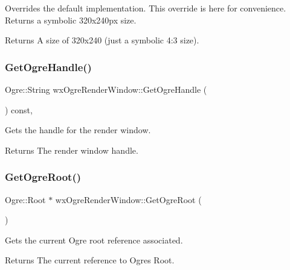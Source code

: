 Overrides the default implementation. This override is here for convenience. Returns a symbolic 320x240px size. \begin{DoxyReturn}{Returns}
A size of 320x240 (just a symbolic 4\+:3 size). 
\end{DoxyReturn}
\mbox{\label{classwx_ogre_render_window_ab855c41487a9b8154be824ff91260f90}} 
\subsubsection{\texorpdfstring{Get\+Ogre\+Handle()}{GetOgreHandle()}}
{\footnotesize\ttfamily Ogre\+::\+String wx\+Ogre\+Render\+Window\+::\+Get\+Ogre\+Handle (\begin{DoxyParamCaption}{ }\end{DoxyParamCaption}) const\hspace{0.3cm}{\ttfamily [protected]}, {\ttfamily [virtual]}}

Gets the handle for the render window. \begin{DoxyReturn}{Returns}
The render window handle. 
\end{DoxyReturn}
\mbox{\label{classwx_ogre_render_window_abe184803840b348854303163f116d267}} 
\subsubsection{\texorpdfstring{Get\+Ogre\+Root()}{GetOgreRoot()}}
{\footnotesize\ttfamily Ogre\+::\+Root $\ast$ wx\+Ogre\+Render\+Window\+::\+Get\+Ogre\+Root (\begin{DoxyParamCaption}{ }\end{DoxyParamCaption})\hspace{0.3cm}{\ttfamily [static]}}

Gets the current Ogre root reference associated. \begin{DoxyReturn}{Returns}
The current reference to Ogre\textquotesingle{}s Root. 
\end{DoxyReturn}
\mbox{\label{classwx_ogre_render_window_a36b111b399516bf7397858c5dbd7405c}} 
